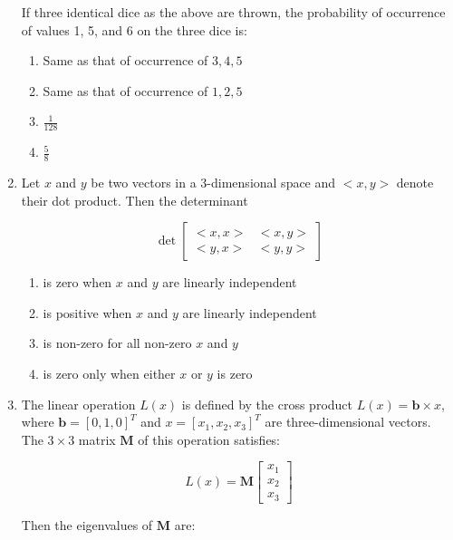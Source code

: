 \documentclass[journal,12pt,onecolumn]{IEEEtran}
\theoremstyle{remark}
\begin{document}
\begin{enumerate}
    If three identical dice as the above are thrown, the probability of occurrence of values 1, 5, and 6 on the three dice is:
    
    \begin{enumerate}
        \item Same as that of occurrence of $3, 4, 5$
        \item Same as that of occurrence of $1, 2, 5$
        \item $\frac{1}{128}$
        \item $\frac{5}{8}$
    \end{enumerate}
        \item Let $x$ and $y$ be two vectors in a 3-dimensional space and $< x, y >$ denote their dot product. Then the determinant

    \[
    \det \begin{bmatrix}
    < x, x > & < x, y > \\
    < y, x > & < y, y >
    \end{bmatrix}
    \]

    \begin{enumerate}
        \item is zero when $x$ and $y$ are linearly independent
        \item is positive when $x$ and $y$ are linearly independent
        \item is non-zero for all non-zero $x$ and $y$
        \item is zero only when either $x$ or $y$ is zero
    \end{enumerate}

    \item The linear operation $L(x)$ is defined by the cross product $L(x) = \mathbf{b} \times x$, where $\mathbf{b} = [0 , 1 , 0]^T$ and $x = [x_1 , x_2 , x_3]^T$ are three-dimensional vectors. The $3 \times 3$ matrix $\mathbf{M}$ of this operation satisfies:

    \[
    L(x) = \mathbf{M} 
    \begin{bmatrix}
    x_1 \\
    x_2 \\
    x_3
    \end{bmatrix}
    \]

    Then the eigenvalues of $\mathbf{M}$ are:


\end{enumerate}
\end{document}
